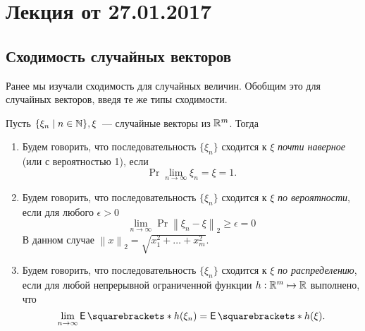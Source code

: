 \section{Лекция от 27.01.2017}
\subsection{Сходимость случайных векторов}
Ранее мы изучали сходимость для случайных величин. Обобщим это для случайных 
векторов, введя те же типы сходимости.
\begin{definition}
	Пусть \(\{\xi_n \mid n \in \mathbb{N}\}, \xi\)~--- случайные векторы из \(\mathbb{R}^m\). 
	Тогда
	\begin{enumerate}
		\item Будем говорить, что последовательность \(\{\xi_n\}\) сходится к 
		\(\xi\) \emph{почти наверное} (или с вероятностью 1), если
		\[
		\Pr{\lim\limits_{n \to \infty}\xi_n = \xi} = 1.
		\]
		\item Будем говорить, что последовательность \(\{\xi_n\}\) сходится к 
		\(\xi\) \emph{по вероятности}, если для любого \(\epsilon > 0\)
		\[
		\lim\limits_{n \to \infty} \Pr{\left\|\xi_n - \xi\right\|_2 \geq 
		\epsilon} = 0
		\]
		В данном случае \(\left\|x\right\|_2 = \sqrt{x_1^2 + \dots + x_m^2}\).
		\item Будем говорить, что последовательность \(\{\xi_n\}\) сходится к 
		\(\xi\) \emph{по распределению}, если для любой непрерывной 
		ограниченной функции \(h : \mathbb{R}^m \mapsto \mathbb{R}\) выполнено, что
		\[
		\lim\limits_{n \to \infty} \E{h(\xi_n)} = \E{h(\xi)}.
		\]
	\end{enumerate}
\end{definition}

